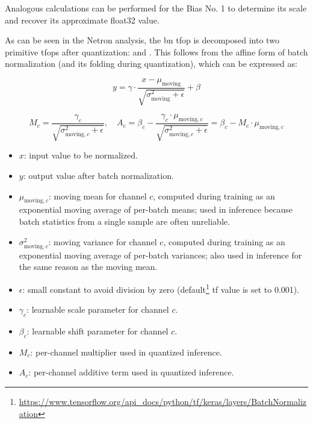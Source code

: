 {Analogous calculations can be performed for the Bias No. 1 to determine its scale and recover its approximate \gls{float32} value.

As can be seen in the Netron analysis, the \gls{bn} \gls{tfop} is decomposed into two primitive \glspl{tfop} after quantization:  and .
This follows from the affine form of batch normalization (and its folding during quantization), which can be expressed as:

\begin{equation}
y = \gamma \cdot \frac{x - \mu_{\text{moving}}}{\sqrt{\sigma^2_{\text{moving}} + \epsilon}} + \beta
\label{eq:bn}
\end{equation}

\begin{equation}
M_c = \frac{\gamma_c}{\sqrt{\sigma^2_{\text{moving},c} + \epsilon}}, 
\quad
A_c = \beta_c - \frac{\gamma_c \cdot \mu_{\text{moving},c}}{\sqrt{\sigma^2_{\text{moving},c} + \epsilon}}
      = \beta_c - M_c \cdot \mu_{\text{moving},c}
\label{eq:bnquant}
\end{equation}

\begin{itemize}
    \item \textbf{$x$}: input value to be normalized.
    \item \textbf{$y$}: output value after batch normalization.
    \item \textbf{$\mu_{\text{moving},c}$}: moving mean for channel $c$, computed during training as an exponential moving average of per-batch means; used in inference because batch statistics from a single sample are often unreliable.
    \item \textbf{$\sigma^2_{\text{moving},c}$}: moving variance for channel $c$, computed during training as an exponential moving average of per-batch variances; also used in inference for the same reason as the moving mean.
    \item \textbf{$\epsilon$}: small constant to avoid division by zero (default\footnote{\url{https://www.tensorflow.org/api_docs/python/tf/keras/layers/BatchNormalization}} \gls{tf} value is set to 0.001).
    \item \textbf{$\gamma_c$}: learnable scale parameter for channel $c$.
    \item \textbf{$\beta_c$}: learnable shift parameter for channel $c$.
    \item \textbf{$M_c$}: per-channel multiplier used in quantized inference.
    \item \textbf{$A_c$}: per-channel additive term used in quantized inference.
\end{itemize}

}

